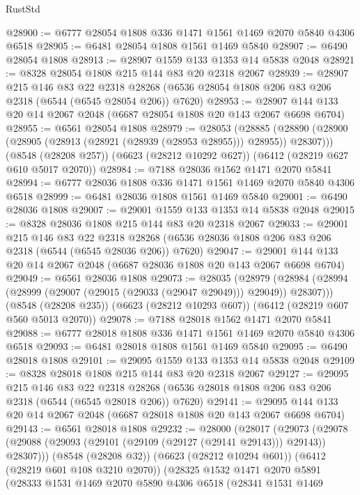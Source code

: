 \begin{lexlean}{RustStd}
\begin{coremodule}
@28900 := @6777 @28054 @1808 @336 @1471 @1561 @1469 @2070 @5840 @4306 @6518
@28905 := @6481 @28054 @1808 @1561 @1469 @5840
@28907 := @6490 @28054 @1808
@28913 := @28907 @1559 @133 @1353 @14 @5838 @2048
@28921 := @8328 @28054 @1808 @215 @144 @83 @20 @2318 @2067
@28939 := @28907
    @215
    @146
    @83
    @22
    @2318
    @28268
    (@6536 @28054 @1808 @206 @83 @206 @2318 (@6544 (@6545 @28054 @206)) @7620)
@28953 := @28907 @144 @133 @20 @14 @2067 @2048 (@6687 @28054 @1808 @20 @143 @2067 @6698 @6704)
@28955 := @6561 @28054 @1808
@28979 := @28053
    (@28885 (@28890 (@28900 (@28905 (@28913 (@28921 (@28939 (@28953 @28955))) @28955)) @28307)))
    (@8548 (@28208 @257))
    (@6623 (@28212 @10292 @627))
    (@6412 (@28219 @627 @610 @5017 @2070))
@28984 := @7188 @28036 @1562 @1471 @2070 @5841
@28994 := @6777 @28036 @1808 @336 @1471 @1561 @1469 @2070 @5840 @4306 @6518
@28999 := @6481 @28036 @1808 @1561 @1469 @5840
@29001 := @6490 @28036 @1808
@29007 := @29001 @1559 @133 @1353 @14 @5838 @2048
@29015 := @8328 @28036 @1808 @215 @144 @83 @20 @2318 @2067
@29033 := @29001
    @215
    @146
    @83
    @22
    @2318
    @28268
    (@6536 @28036 @1808 @206 @83 @206 @2318 (@6544 (@6545 @28036 @206)) @7620)
@29047 := @29001 @144 @133 @20 @14 @2067 @2048 (@6687 @28036 @1808 @20 @143 @2067 @6698 @6704)
@29049 := @6561 @28036 @1808
@29073 := @28035
    (@28979 (@28984 (@28994 (@28999 (@29007 (@29015 (@29033 (@29047 @29049))) @29049)) @28307)))
    (@8548 (@28208 @235))
    (@6623 (@28212 @10293 @607))
    (@6412 (@28219 @607 @560 @5013 @2070))
@29078 := @7188 @28018 @1562 @1471 @2070 @5841
@29088 := @6777 @28018 @1808 @336 @1471 @1561 @1469 @2070 @5840 @4306 @6518
@29093 := @6481 @28018 @1808 @1561 @1469 @5840
@29095 := @6490 @28018 @1808
@29101 := @29095 @1559 @133 @1353 @14 @5838 @2048
@29109 := @8328 @28018 @1808 @215 @144 @83 @20 @2318 @2067
@29127 := @29095
    @215
    @146
    @83
    @22
    @2318
    @28268
    (@6536 @28018 @1808 @206 @83 @206 @2318 (@6544 (@6545 @28018 @206)) @7620)
@29141 := @29095 @144 @133 @20 @14 @2067 @2048 (@6687 @28018 @1808 @20 @143 @2067 @6698 @6704)
@29143 := @6561 @28018 @1808
@29232 := @28000
    (@28017
      (@29073 (@29078 (@29088 (@29093 (@29101 (@29109 (@29127 (@29141 @29143))) @29143)) @28307)))
      (@8548 (@28208 @32))
      (@6623 (@28212 @10294 @601))
      (@6412 (@28219 @601 @108 @3210 @2070))
      (@28325
        @1532
        @1471
        @2070
        @5891
        (@28333
          @1531
          @1469
          @2070
          @5890
          @4306
          @6518
          (@28341
            @1531
            @1469

\end{coremodule}
\end{lexlean}
